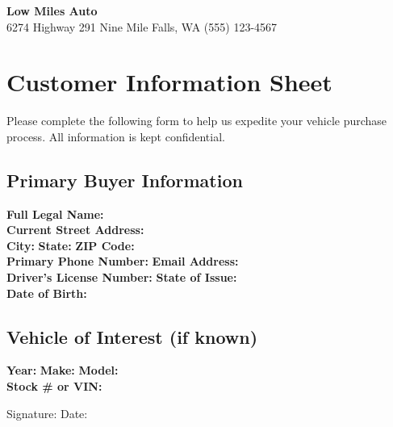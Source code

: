 \documentclass[12pt]{article}
\newcommand{\dealerName}{Low Miles Auto}
\newcommand{\dealerAddress}{6274 Highway 291 Nine Mile Falls, WA}
\newcommand{\dealerPhone}{(555) 123-4567}
\begin{document}
\begin{center}
    {\Huge \bfseries \dealerName} \\
    \vspace{2mm}
    {\large \faMapMarkerAlt \hspace{1mm} \dealerAddress \quad \faPhone \hspace{1mm} \dealerPhone}
\end{center}

\section*{Customer Information Sheet}
\label{sec:customer-info}

Please complete the following form to help us expedite your vehicle purchase process. All information is kept confidential.

\subsection*{Primary Buyer Information}

\noindent\textbf{Full Legal Name:} \hrulefill \\
\vspace{6mm}
\noindent\textbf{Current Street Address:} \hrulefill \\
\vspace{6mm}
\noindent\textbf{City:} \hrulefill \quad \textbf{State:} \hrulefill \quad \textbf{ZIP Code:} \hrulefill \\
\vspace{6mm}
\noindent\textbf{Primary Phone Number:} \hrulefill \quad \textbf{Email Address:} \hrulefill \\
\vspace{6mm}
\noindent\textbf{Driver's License Number:} \hrulefill \quad \textbf{State of Issue:} \hrulefill \\
\vspace{6mm}
\noindent\textbf{Date of Birth:} \hrulefill

\subsection*{Vehicle of Interest (if known)}

\noindent\textbf{Year:} \hrulefill \quad \textbf{Make:} \hrulefill \quad \textbf{Model:} \hrulefill \\
\vspace{6mm}
\noindent\textbf{Stock \# or VIN:} \hrulefill

\vspace{12mm}

\noindent Signature: \hrulefill \quad Date: \hrulefill
\end{document}
